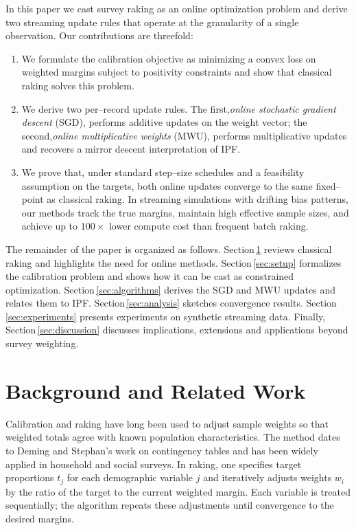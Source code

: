 \documentclass[12pt, letterpaper]{article}
\begin{document}
In this paper we cast survey raking as an online optimization problem and
derive two streaming update rules that operate at the granularity of a
single observation.  Our contributions are threefold:
\begin{enumerate}
  \item We formulate the calibration objective as minimizing a convex
    loss on weighted margins subject to positivity constraints and show
    that classical raking solves this problem.
  \item We derive two per--record update rules.  The first,\emph{online
    stochastic gradient descent} (SGD), performs additive updates on the
    weight vector; the second,\emph{online multiplicative weights} (MWU),
    performs multiplicative updates and recovers a mirror descent
    interpretation of IPF.
  \item We prove that, under standard step--size schedules and a
    feasibility assumption on the targets, both online updates converge
    to the same fixed--point as classical raking.  In streaming
    simulations with drifting bias patterns, our methods track the true
    margins, maintain high effective sample sizes, and achieve up to
    \(100\times\) lower compute cost than frequent batch raking.
\end{enumerate}

The remainder of the paper is organized as follows.  Section\,\ref{sec:background}
reviews classical raking and highlights the need for online methods.
Section\,\ref{sec:setup} formalizes the calibration problem and shows
how it can be cast as constrained optimization.  Section\,\ref{sec:algorithms}
derives the SGD and MWU updates and relates them to IPF.  Section\,\ref{sec:analysis}
sketches convergence results.  Section\,\ref{sec:experiments}
presents experiments on synthetic streaming data.  Finally,
Section\,\ref{sec:discussion} discusses implications, extensions and
applications beyond survey weighting.

\section{Background and Related Work}
\label{sec:background}

Calibration and raking have long been used to adjust sample weights so
that weighted totals agree with known population characteristics.  The
method dates to Deming and Stephan's work on contingency tables
\citep{Deming1940} and has been widely applied in household and social
surveys\citep{Kolenikov2015}.  In raking, one specifies target proportions
\(t_j\) for each demographic variable \(j\) and iteratively adjusts
weights \(w_i\) by the ratio of the target to the current weighted
margin.  Each variable is treated sequentially; the algorithm repeats
these adjustments until convergence to the desired margins.
\end{document}

